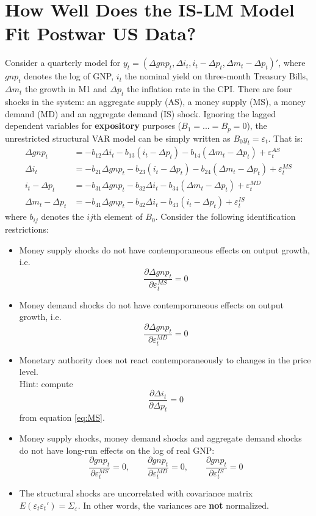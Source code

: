 \documentclass{article}
\begin{document}
\newpage


\section{How Well Does the IS-LM Model Fit Postwar US Data?}
Consider a quarterly model for $y_t = (\Delta gnp_t, \Delta i_t, i_t-\Delta p_t, \Delta m_t - \Delta p_t)'$,
  where $gnp_t$ denotes the log of GNP, $i_t$ the nominal yield on three-month Treasury Bills,
  $\Delta m_t$ the growth in M1 and $\Delta p_t$ the inflation rate in the CPI.
There are four shocks in the system: an aggregate supply (AS), a money supply (MS), a money demand (MD) and an aggregate demand (IS) shock.
Ignoring the lagged dependent variables for \textbf{expository} purposes ($B_1=...=B_p=0$),
  the unrestricted structural VAR model can be simply written as $B_0 y_t = \varepsilon_t$. That is:
\begin{align}
\Delta gnp_t &= -b_{12}\Delta i_t -b_{13}(i_t-\Delta p_t) -b_{14}(\Delta m_t-\Delta p_t) + \varepsilon_t^{AS} \label{eq:AS}\\
\Delta i_t &= -b_{21}\Delta gnp_t -b_{23}(i_t-\Delta p_t) -b_{24}(\Delta m_t-\Delta p_t) + \varepsilon_t^{MS} \label{eq:MS}\\
i_t - \Delta p_t &= -b_{31}\Delta gnp_t -b_{32}\Delta i_t -b_{34}(\Delta m_t-\Delta p_t) + \varepsilon_t^{MD} \label{eq:MD}\\
\Delta m_t - \Delta p_t &= -b_{41}\Delta gnp_t -b_{42}\Delta i_t - b_{43} (i_t-\Delta p_t) + \varepsilon_t^{IS} \label{eq:IS}
\end{align}
where $b_{ij}$ denotes the $ij$th element of $B_0$.
Consider the following identification restrictions:
\begin{itemize}
	\item Money supply shocks do not have contemporaneous effects on output growth, i.e.
	$$\frac{\partial \Delta gnp_t}{\partial \varepsilon_t^{MS}}=0$$	
	\item Money demand shocks do not have contemporaneous effects on output growth, i.e.
	$$\frac{\partial \Delta gnp_t}{\partial \varepsilon_t^{MD}}=0$$	
	\item Monetary authority does not react contemporaneously to changes in the price level.\\Hint: compute
	$$\frac{\partial \Delta i_t}{\partial \Delta p_t}=0$$
	from equation \eqref{eq:MS}.
	\item Money supply shocks, money demand shocks and aggregate demand shocks do not have long-run effects on the log of real GNP:	
	$$\frac{\partial gnp_t}{\partial \varepsilon_t^{MS}}=0,\qquad \frac{\partial gnp_t}{\partial \varepsilon_t^{MD}}=0,\qquad \frac{\partial gnp_t}{\partial \varepsilon_t^{IS}}=0$$	
	\item The structural shocks are uncorrelated with covariance matrix $E(\varepsilon_t \varepsilon_t')=\Sigma_\varepsilon$.
	In other words, the variances are \textbf{not} normalized.
\end{itemize}
\end{document}

